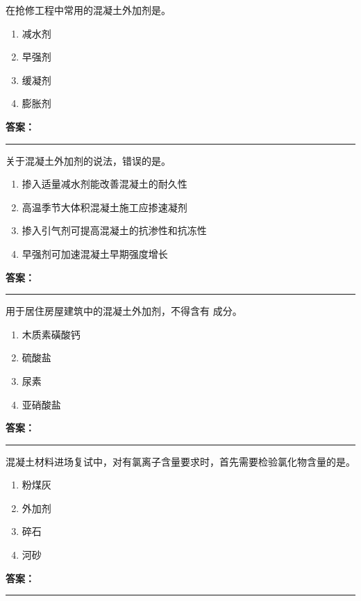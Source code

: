 \documentclass[UTF8,fontset=fandol,11pt]{ctexart}
\newcommand{\answerline}{\textcolor{answerred}{\rule{2.4cm}{0.7pt}}}
\begin{document}
\vspace{0.2em}

\begin{quizbox}[title={第 67 题}]
在抢修工程中常用的混凝土外加剂是。\\
\begin{enumerate}[label=\Alph*.]
\item 减水剂
\item 早强剂
\item 缓凝剂
\item 膨胀剂
\end{enumerate}
\textbf{\textcolor{answerred}{答案：}} \answerline
\end{quizbox}

\vspace{0.2em}

\begin{quizbox}[title={第 68 题}]
关于混凝土外加剂的说法，错误的是。\\
\begin{enumerate}[label=\Alph*.]
\item 掺入适量减水剂能改善混凝土的耐久性
\item 高温季节大体积混凝土施工应掺速凝剂
\item 掺入引气剂可提高混凝土的抗渗性和抗冻性
\item 早强剂可加速混凝土早期强度增长
\end{enumerate}
\textbf{\textcolor{answerred}{答案：}} \answerline
\end{quizbox}

\vspace{0.2em}

\begin{quizbox}[title={第 69 题}]
用于居住房屋建筑中的混凝土外加剂，不得含有 成分。\\
\begin{enumerate}[label=\Alph*.]
\item 木质素磺酸钙
\item 硫酸盐
\item 尿素
\item 亚硝酸盐
\end{enumerate}
\textbf{\textcolor{answerred}{答案：}} \answerline
\end{quizbox}

\vspace{0.2em}

\begin{quizbox}[title={第 70 题}]
混凝土材料进场复试中，对有氯离子含量要求时，首先需要检验氯化物含量的是。\\
\begin{enumerate}[label=\Alph*.]
\item 粉煤灰
\item 外加剂
\item 碎石
\item 河砂
\end{enumerate}
\textbf{\textcolor{answerred}{答案：}} \answerline
\end{quizbox}
\end{document}
